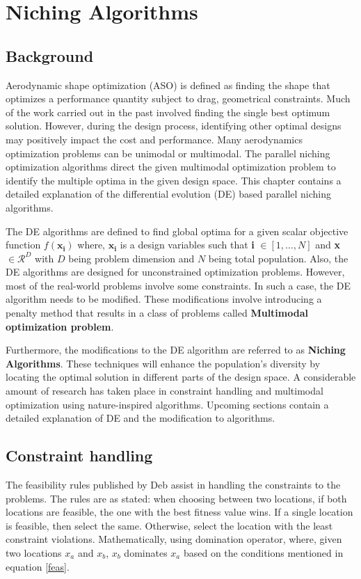 \chapter{Niching Algorithms}
\label{niching}
\section{Background}
Aerodynamic shape optimization (ASO) is defined as finding the shape that optimizes a performance quantity subject to drag, geometrical constraints. Much of the work carried out in the past involved finding the single best optimum solution. However, during the design process, identifying other optimal designs may positively impact the cost and performance. Many aerodynamics optimization problems can be unimodal or multimodal. The parallel niching optimization algorithms direct the given multimodal optimization problem to identify the multiple optima in the given design space. This chapter contains a detailed explanation of the differential evolution (DE) based parallel niching algorithms.

 The DE algorithms are defined to find global optima for a given scalar objective function $f\mathbf{(x_i)}$ where, $\mathbf{x_i}$ is a design variables such that \textbf{i} $\in[1,\ldots,N]$ and \textbf{x} $\in{\mathcal{R}^D}$ with $D$ being problem dimension and $N$ being total population. Also, the DE algorithms are designed for unconstrained optimization problems. However, most of the real-world problems involve some constraints. In such a case, the DE algorithm needs to be modified. These modifications involve introducing a penalty method that results in a class of problems called \textbf{Multimodal optimization problem}.

Furthermore, the modifications to the DE algorithm are referred to as \textbf{Niching Algorithms}. These techniques will enhance the population’s diversity by locating the optimal solution in different parts of the design space. A considerable amount of research has taken place in constraint handling and multimodal optimization using nature-inspired algorithms. Upcoming sections contain a detailed explanation of DE and the modification to algorithms.


\section{Constraint handling}
The feasibility rules published by Deb \cite{Daniel} assist in handling the constraints to the problems. The rules are as stated: when choosing between two
locations, if both locations are feasible, the one with the best fitness value wins. If a single location is feasible, then select the same. Otherwise, select the location with the least constraint violations. Mathematically, using domination operator, where, given two locations $x_a$ and $x_b$, $x_b$ dominates $x_a$ based on the conditions mentioned in equation \ref{feas}.


